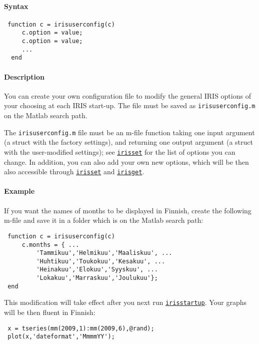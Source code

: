 


	\paragraph{Syntax}
 
 \begin{verbatim}
 function c = irisuserconfig(c)
     c.option = value;
     c.option = value;
     ...
  end
 \end{verbatim}
 
 \paragraph{Description}
 
 You can create your own configuration file to modify the general IRIS
 options of your choosing at each IRIS start-up. The file must be saved
 as \texttt{irisuserconfig.m} on the Matlab search path.
 
 The \texttt{irisuserconfig.m} file must be an m-file function taking one
 input argument (a struct with the factory settings), and returning one
 output argument (a struct with the user-modified settings); see
 \href{config/irisset}{\texttt{irisset}} for the list of options you can
 change. In addition, you can also add your own new options, which will
 be then also accessible through \href{config/irisset}{\texttt{irisset}}
 and \href{config/irisget}{\texttt{irisget}}.
 
 \paragraph{Example}
 
 If you want the names of months to be displayed in Finnish, create the
 following m-file and save it in a folder which is on the Matlab search
 path:
 
 \begin{verbatim}
 function c = irisuserconfig(c)
     c.months = { ...
         'Tammikuu','Helmikuu','Maaliskuu', ...
         'Huhtikuu','Toukokuu','Kesakuu', ...
         'Heinakuu','Elokuu','Syyskuu', ...
         'Lokakuu','Marraskuu','Joulukuu'};
 end
 \end{verbatim}
 
 This modification will take effect after you next run
 \href{config/irisstartup}{\texttt{irisstartup}}. Your graphs will be
 then fluent in Finnish:
 
 \begin{verbatim}
 x = tseries(mm(2009,1):mm(2009,6),@rand);
 plot(x,'dateformat','MmmmYY');
 \end{verbatim}


